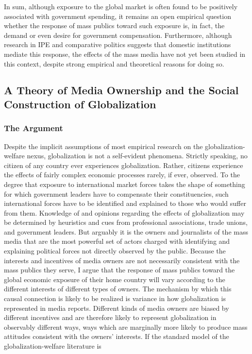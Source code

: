 \documentclass[a4paper]{article}
\begin{document}
	In sum, although exposure to the global market is often found to be positively associated with government spending, it remains an open empirical question whether the response of mass publics toward such exposure is, in fact, the demand or even desire for government compensation. Furthermore, although research in IPE and comparative politics suggests that domestic institutions mediate this response, the effects of the mass media have not yet been studied in this context, despite strong empirical and theoretical reasons for doing so.

\subsection{A Theory of Media Ownership and the Social Construction of Globalization}
\subsubsection{The Argument}

	Despite the implicit assumptions of most empirical research on the globalization-welfare nexus, globalization is not a self-evident phenomena. Strictly speaking, no citizen of any country ever experiences globalization. Rather, citizens experience the effects of fairly complex economic processes rarely, if ever, observed. To the degree that exposure to international market forces takes the shape of something for which government leaders have to compensate their constituencies, such international forces have to be identified and explained to those who would suffer from them. Knowledge of and opinions regarding the effects of globalization may be determined by heuristics and cues from professional associations, trade unions, and government leaders. But arguably it is the owners and journalists of the mass media that are the most powerful set of actors charged with identifying and explaining political forces not directly observed by the public. Because the interests and incentives of media owners are not necessarily consistent with the mass publics they serve, I argue that the response of mass publics toward the global economic exposure of their home country will vary according to the different interests of different types of owners. The mechanism by which this causal connection is likely to be realized is variance in how globalization is represented in media reports.
	Different kinds of media owners are biased by different incentives and are therefore likely to represent globalization in observably different ways, ways which are marginally more likely to produce mass attitudes consistent with the owners' interests. If the standard model of the globalization-welfare literature is 
\end{document}
